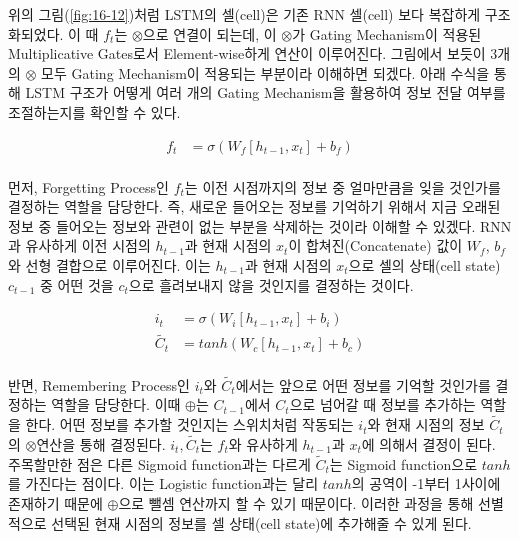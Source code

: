 \documentclass[draft=false]{oblivoir}
\begin{document}
위의 그림(\ref{fig:16-12})처럼 LSTM의 셀(cell)은 기존 RNN 셀(cell) 보다 복잡하게 구조화되었다. 이 때 $f_t$는 $\otimes$으로 연결이 되는데, 이 $\otimes$가 Gating Mechanism이 적용된 Multiplicative Gates로서 Element-wise하게 연산이 이루어진다. 그림에서 보듯이 3개의 $\otimes$ 모두 Gating Mechanism이 적용되는 부분이라 이해하면 되겠다. 아래 수식을 통해 LSTM 구조가 어떻게 여러 개의 Gating Mechanism을 활용하여 정보 전달 여부를 조절하는지를 확인할 수 있다. 

\begin{equation}
	\begin{split}
		f_t &= \sigma (W_f [h_{t-1}, x_t] + b_f)\\
	\end{split}
	\label{eq:16-9}
\end{equation}

먼저, Forgetting Process인 $f_t$는 이전 시점까지의 정보 중 얼마만큼을 잊을 것인가를 결정하는 역할을 담당한다. 즉, 새로운 들어오는 정보를 기억하기 위해서 지금 오래된 정보 중 들어오는 정보와 관련이 없는 부분을 삭제하는 것이라 이해할 수 있겠다. RNN과 유사하게 이전 시점의 $h_{t-1}$과 현재 시점의 $x_t$이 합쳐진(Concatenate) 값이 $W_f$, $b_f$와 선형 결합으로 이루어진다. 이는  $h_{t-1}$과 현재 시점의 $x_t$으로 셀의 상태(cell state) $c_{t-1}$ 중 어떤 것을 $c_t$으로 흘려보내지 않을 것인지를 결정하는 것이다.\par

\begin{equation}
	\begin{split}
		i_t &= \sigma (W_i [h_{t-1}, x_t] + b_i)\\
        \tilde{C_t} & = tanh (W_c [h_{t-1}, x_t] + b_c)\\
	\end{split}
	\label{eq:16-10}
\end{equation}

반면, Remembering Process인 $i_t$와 $\tilde{C_t}$에서는 앞으로 어떤 정보를 기억할 것인가를 결정하는 역할을 담당한다. 이때 $\oplus$는 $C_{t-1}$에서 $C_t$으로 넘어갈 때 정보를 추가하는 역할을 한다. 어떤 정보를 추가할 것인지는 스위치처럼 작동되는 $i_t$와 현재 시점의 정보 $\tilde{C_t}$의 $\otimes$연산을 통해 결정된다. $i_t, \tilde{C_t}$는 $f_t$와 유사하게 $h_{t-1}$과 $x_t$에 의해서 결정이 된다. 주목할만한 점은 다른 Sigmoid function과는 다르게 $\tilde{C}_t$는 Sigmoid function으로 $tanh$를 가진다는 점이다. 이는 Logistic function과는 달리 $tanh$의 공역이 -1부터 1사이에 존재하기 때문에 $\oplus$으로 뺄셈 연산까지 할 수 있기 때문이다. 이러한 과정을 통해 선별적으로 선택된 현재 시점의 정보를 셀 상태(cell state)에 추가해줄 수 있게 된다.\par
\end{document}
